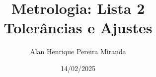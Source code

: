 \documentclass[a4paper, 11pt]{article}
\begin{document}
    \title{\textbf{Metrologia:} Lista 2 \\Tolerâncias e Ajustes}
    \author{Alan Henrique Pereira Miranda}
    \date{14/02/2025}
    \maketitle
    
\end{document}
